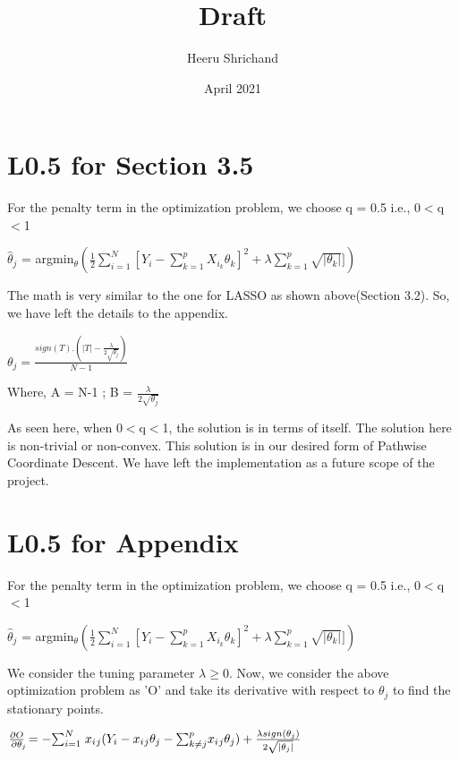 \documentclass{article}
\title{Draft}
\author{Heeru Shrichand}
\date{April 2021}
\begin{document}
\section{L0.5 for Section 3.5}

For the penalty term in the optimization problem, we choose q = 0.5 i.e., 0$<$q$<$1
\newline

$\hat{\theta}_j$ = argmin$_{\theta} {( \frac{1}{2}  \sum_{i=1}^{N}[Y_i - \sum_{k=1}^{p} X_{i_k}\theta_k]^2  + \lambda \sum_{k=1}^p \sqrt{|\theta_k|}])}$
\newline


The math is very similar to the one for LASSO as shown above(Section 3.2). So, we have left the details to the appendix. 
\newline


    $\theta_j = \frac{sign(T).(|T| - \frac{\lambda}{2\sqrt{\theta_j}})}{N-1}$
\newline

Where, 
A = N-1 ; B = $\frac{\lambda}{2\sqrt{\theta_j}}$
\newline

As seen here, when 0$<$q$<$1, the solution is in terms of itself. The solution here is non-trivial or non-convex. This solution is in our desired form of Pathwise Coordinate Descent. We have left the implementation as a future scope of the project.  

\section{L0.5 for Appendix}
For the penalty term in the optimization problem, we choose q = 0.5 i.e., 0$<$q$<$1
\newline

$\hat{\theta}_j$ = argmin$_{\theta} {( \frac{1}{2}  \sum_{i=1}^{N}[Y_i - \sum_{k=1}^{p} X_{i_k}\theta_k]^2  + \lambda \sum_{k=1}^p \sqrt{|\theta_k|}])}$
\newline

We consider the tuning parameter $\lambda\geq$0. Now, we consider the above optimization problem as 'O' and take its derivative with respect to $\theta_j$ to find the stationary points. 
\newline

$\frac{\partial O}{\partial \theta_{\rlap{$\scriptscriptstyle j$}}} = - {\sum}_{i=1}^{N} \; x_i{_j}(Y_i - x_i{_j}\theta_j - {\sum}_{k\neq j}^{p} x_i{_j}\theta_j) + \frac{\lambda sign(\theta_j)}{2 \sqrt{|\theta_j|}}$
\newline
\end{document}

